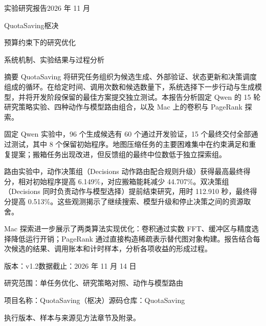 \documentclass[11pt,a4paper,UTF8,fontset=none]{ctexart}
\begin{document}
\thispagestyle{empty}
{\noindent\sffamily\small\color{teal}实验研究报告\hfill 2026 年 11 月}
\vspace{15mm}

{\noindent\sffamily\fontsize{36}{44}\selectfont\color{ink}QuotaSaving\quad 枢决}\par
\vspace{5mm}
{\noindent\sffamily\fontsize{24}{33}\selectfont\color{ink}预算约束下的研究优化}\par
\vspace{3mm}
{\noindent\sffamily\large\color{muted}系统机制、实验结果与过程分析}
\vspace{10mm}

\begin{finding}{摘要}
QuotaSaving 将研究任务组织为候选生成、外部验证、状态更新和决策调度组成的循环。在给定时间、调用次数和候选数量下，系统选择下一步行动与生成模型，并将开发阶段保留的最佳方案提交独立测试。本报告分析固定 Qwen 的 15 轮研究策略实验、四种动作与模型路由组合，以及 Mac 上的卷积与 PageRank 探索。

固定 Qwen 实验中，96 个生成候选有 60 个通过开发验证，15 个最终交付全部通过测试，其中 8 个保留初始程序。地图压缩任务的主要困难集中在约束满足和重复提案；搬箱任务出现改进，但反馈组的最终中位数低于独立探索组。

路由实验中，动作决策组（Decisions 动作路由配合规则升级）获得最高最终得分，相对初始程序提高 6.149\%，对应搬箱能耗减少 44.707\%。双决策组（Decisions 同时负责动作与模型选择）提前结束研究，用时 112.910 秒，最终得分提高 0.513\%。这些观测揭示了继续搜索、模型升级和停止决策之间的资源取舍。

Mac 探索进一步展示了两类算法实现优化：卷积通过实数 FFT、缓冲区与精度选择降低运行开销；PageRank 通过直接构造稀疏表示替代图对象构建。报告结合每次候选的结果、调用账本和计时样本，分析各项收益的形成过程。
\end{finding}
\vfill
{\noindent\small\color{muted}
版本：v1.2\quad 数据截止：2026 年 11 月 14 日\par
研究范围：单任务优化、研究策略对照、动作与模型路由\par
项目名称：QuotaSaving（枢决）\quad 源码仓库：QuotaSaving\par
执行版本、样本与来源见方法章节及附录。
}

\clearpage
\tableofcontents
\vspace{8mm}
\end{document}
